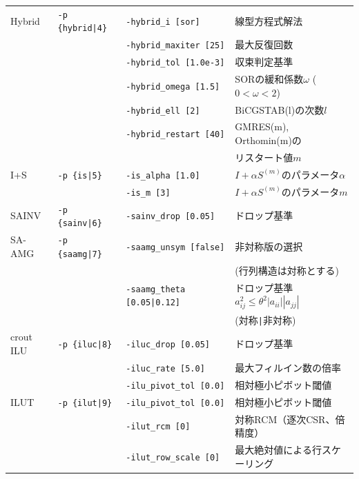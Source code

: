 \documentclass[a4paper]{jarticle}
\begin{document}
{{\begin{minipage}[t]{\textwidth}
\begin{center}
\begin{tabular}{l|lll}
Hybrid   & \verb=-p {hybrid|4}=  & \verb=-hybrid_i [sor]=  & 線型方程式解法 \\
         &                       & \verb=-hybrid_maxiter [25]= & 最大反復回数 \\
         &                       & \verb=-hybrid_tol [1.0e-3]= & 収束判定基準 \\
         &                       & \verb=-hybrid_omega [1.5]=  & SORの緩和係数$\omega$ ($0<\omega<2$) \\
         &                       & \verb=-hybrid_ell [2]=      & BiCGSTAB(l)の次数$l$\\
         &                       & \verb=-hybrid_restart [40]= & GMRES(m), Orthomin(m)の \\
         &                       &                             & リスタート値$m$ \\
I+S      & \verb=-p {is|5}=      & \verb=-is_alpha [1.0]=  & $I+\alpha S^{(m)}$のパラメータ$\alpha$ \\
         &                       & \verb=-is_m [3]=        & $I+\alpha S^{(m)}$のパラメータ$m$ \\
SAINV    & \verb=-p {sainv|6}=   & \verb=-sainv_drop [0.05]=    & ドロップ基準\\
SA-AMG   & \verb=-p {saamg|7}=   & \verb=-saamg_unsym [false]=     & 非対称版の選択 \\
         &                       &                                 & (行列構造は対称とする) \\
         &                       & \verb=-saamg_theta [0.05|0.12]= & ドロップ基準 $a^2_{ij}\le\theta^2|a_{ii}||a_{jj}|$ \\
         &                       &                             & (対称\verb=|=非対称) \\
crout ILU& \verb=-p {iluc|8}=    & \verb=-iluc_drop [0.05]=    & ドロップ基準    \\
         &                       & \verb=-iluc_rate [5.0]=     & 最大フィルイン数の倍率 \\
         &                       & \verb=-ilu_pivot_tol [0.0]= & 相対極小ピボット閾値 \\
ILUT     & \verb=-p {ilut|9}=    & \verb=-ilu_pivot_tol [0.0]= & 相対極小ピボット閾値 \\
         &                       & \verb=-ilut_rcm [0]= & 対称RCM（逐次CSR、倍精度） \\
         &                       & \verb=-ilut_row_scale [0]= & 最大絶対値による行スケーリング \\

\end{tabular}
\end{center}
\end{minipage}}}
\end{document}
